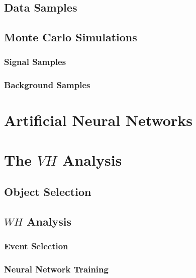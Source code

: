 \documentclass{umassthesis}          %
\begin{document}
\section{Data Samples}\label{sec:data_samples}

\section{Monte Carlo Simulations}\label{sec:mc_simulations}
\subsection{Signal Samples}\label{sec:signal_samples}

\subsection{Background Samples}\label{sec:background_samples}


\chapter{Artificial Neural Networks}\label{ch:nn}


\chapter{\texorpdfstring{The $VH$ Analysis}{The VH Analysis}}\label{ch:vh_analysis}

\section{Object Selection}\label{sec:vh_object_selection}

\section{\texorpdfstring{$WH$}{WH} Analysis}\label{sec:vh_wh_analysis}

\subsection{Event Selection}\label{sec:vh_wh_event_selection}

\subsection{Neural Network Training}\label{sec:vh_wh_nn_training}
\end{document}
